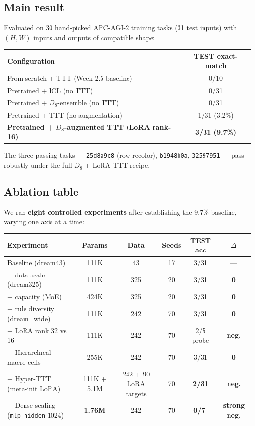\documentclass[11pt]{article}
\begin{document}
\subsection{Main result}

Evaluated on 30 hand-picked ARC-AGI-2 training tasks (31 test inputs) with $(H, W)$ inputs and outputs of compatible shape:

\begin{center}
\begin{tabular}{lc}
\toprule
Configuration & TEST exact-match \\
\midrule
From-scratch + TTT (Week 2.5 baseline) & 0/10 \\
Pretrained + ICL (no TTT) & 0/31 \\
Pretrained + $D_8$-ensemble (no TTT) & 0/31 \\
Pretrained + TTT (no augmentation) & 1/31 (3.2\%) \\
\textbf{Pretrained + $D_8$-augmented TTT (LoRA rank-16)} & \textbf{3/31 (9.7\%)} \\
\bottomrule
\end{tabular}
\end{center}

The three passing tasks --- \texttt{25d8a9c8} (row-recolor), \texttt{b1948b0a}, \texttt{32597951} --- pass robustly under the full $D_8$ + LoRA TTT recipe.

\subsection{Ablation table}
\label{sec:ablation}

We ran \textbf{eight controlled experiments} after establishing the 9.7\% baseline, varying one axis at a time:

\begin{center}
\begin{tabular}{lccccc}
\toprule
Experiment & Params & Data & Seeds & TEST acc & $\Delta$ \\
\midrule
Baseline (dream43) & 111K & 43 & 17 & 3/31 & --- \\
+ data scale (dream325) & 111K & 325 & 20 & 3/31 & \textbf{0} \\
+ capacity (MoE) & 424K & 325 & 20 & 3/31 & \textbf{0} \\
+ rule diversity (dream\_wide) & 111K & 242 & 70 & 3/31 & \textbf{0} \\
+ LoRA rank 32 vs 16 & 111K & 242 & 70 & 2/5 probe & \textbf{neg.} \\
+ Hierarchical macro-cells & 255K & 242 & 70 & 3/31 & \textbf{0} \\
+ Hyper-TTT (meta-init LoRA) & 111K + 5.1M & 242 + 90 LoRA targets & 70 & \textbf{2/31} & \textbf{neg.} \\
+ Dense scaling (\texttt{mlp\_hidden} 1024) & \textbf{1.76M} & 242 & 70 & \textbf{0/7}$^\dagger$ & \textbf{strong neg.} \\
\bottomrule
\end{tabular}
\end{center}
\end{document}
